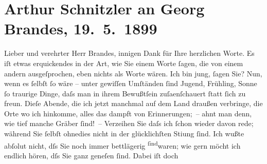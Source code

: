 

         
         \renewcommand{\erwaehntePersonen}{Personen: Georg Brandes, Ludwig Fulda}
         \renewcommand{\erwaehnteInstitutionen}{Institutionen: Die Zukunft}
         \renewcommand{\erwaehnteOrte}{Orte: Dänemark, Kopenhagen, Niederösterreich, Wien}
         \renewcommand{\erwaehnteWerke}{Werke: Samlede Skrifter [Gesammelte Werke], Ungdomsvers [Jugendgedichte]}
               \section[Arthur Schnitzler an Georg Brandes, 19. 5. 1899]{ Arthur Schnitzler an Georg Brandes, 19. 5. 1899}\nopagebreak{}\rehead{ }\begin{ledgroupsized}[t]{13cm}\normalsize\beginnumbering \toendnotes[C]{\smallbreak\pagebreak[2]} 
\toendnotes[C]{\smallbreak}\pstart{}{\pb}Lieber und verehrter Herr Brandes,\pend\pstart
           innigen Dank für Ihre herzlichen Worte. Es iſt etwas erquickendes in der Art, wie Sie
               einem Worte ſagen, die von einem andern ausgeſprochen, eben nichts als Worte wären.
               Ich bin jung, ſagen Sie? Nun, wenn es ſelbſt ſo wäre – unter gewiſſen Umſtänden ſind
               Jugend, Frühling, Sonne ſo traurige Dinge, daſs man in ihrem Bewußtſein zuſa{\geminationm}enſchauert ſtatt ſich zu {\pb}freun. Dieſe Abende, die ich jetzt manchmal auf
               dem Land draußen verbringe, die Orte wo ich hinkomme, alles das dampft von
               Erinnerungen; – ahnt man denn, wie tief manche Gräber ſind! –\pend
           \pstart
           Verzeihen Sie daſs ich ſchon wieder davon rede; während Sie ſelbſt ohnedies nicht in
               der glücklichſten Sti{\geminationm}ung ſind. Ich wußte abſolut nicht,
               dſs Sie noch immer bettläge{\pb}rig \substVorne{}\textsuperscript{ſind}\substDazwischen{}waren\substHinten{}; wie gern möcht ich endlich hören, dſs Sie ganz geneſen ſind. Dabei iſt doch

\end{ledgroupsized}
